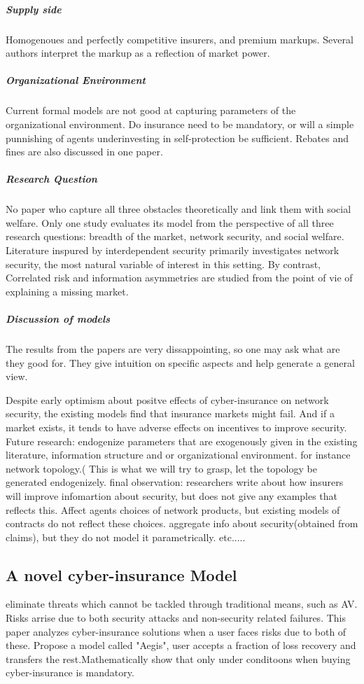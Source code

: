 \subparagraph{Supply side}
Homogenoues and perfectly competitive insurers, and premium markups.  Several authors interpret the markup as a reflection of market power. 
\subparagraph{Organizational Environment}
Current formal models are not good at capturing parameters of the organizational environment. Do insurance need to be mandatory, 
or will a simple punnishing of agents underinvesting in self-protection be sufficient. Rebates and fines are also discussed in one paper. 
\subparagraph{Research Question}
No paper who capture all three obstacles theoretically and link them with social welfare.
Only one study evaluates its model from the perspective of all three research questions: breadth of the market, 
network security, and social welfare. Literature inspured by interdependent security primarily investigates network security,
 the most natural variable of interest in this setting. 
 By contrast, Correlated risk and information asymmetries are studied from the point of vie of explaining a missing market.

\subparagraph{Discussion of models}
The results from the papers are very dissappointing, so one may ask what are they good for. They give intuition on specific aspects and help generate a general view. 


Despite early optimism about positve effects of cyber-insurance on network security, the existing models find that insurance markets might fail. And if a market exists, it tends to have adverse effects on incentives to improve security.
Future research: endogenize parameters that are exogenously given in the existing literature, information structure and or organizational environment. 
for instance network topology.( This is what we will try to grasp, let the topology be generated endogenizely. 
final observation: researchers write about how insurers will improve infomartion about security, but does not give any examples that reflects this. Affect agents choices of network products, but existing models of contracts do not reflect these choices. aggregate info about security(obtained from claims), but they do not model it parametrically. etc.....


\subsection{A novel cyber-insurance Model}
\cite{pal2011aegis}
eliminate threats which cannot be tackled through traditional means, such as AV. Risks arrise due to both security attacks and non-security related failures. This paper analyzes cyber-insurance solutions when a user faces risks due to both of these. Propose a model called "Aegis", user accepts a fraction of loss recovery and transfers the rest.Mathematically show that only under conditoons when buying cyber-insurance  is mandatory.



